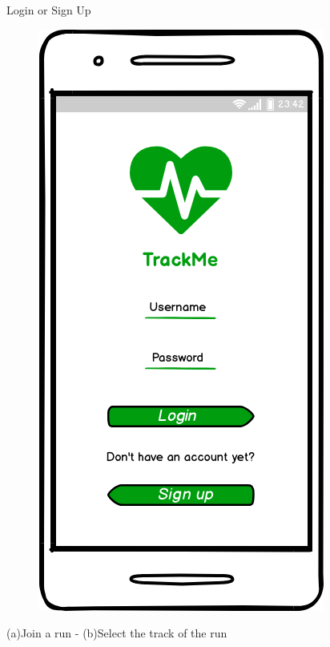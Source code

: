 \documentclass{article}
\begin{document}
\begin{legal}
\begin{legal}
\begin{legal}
{						
					\begin{legal}
    					\item Login or Sign Up 
						\begin{figure}[H]
						\centering
  						\includegraphics[scale=0.275]{./images/mockups/Login-Sign-up.png}
						\end{figure}
					\item  (a)Join a run - (b)Select the track of the run
						\begin{figure}[H]
						\centering
						\begin{subfigure}{.5\textwidth}
  						\centering

\end{subfigure}
\end{figure}
\end{legal}}
\end{legal}
\end{legal}
\end{legal}
\end{document}
